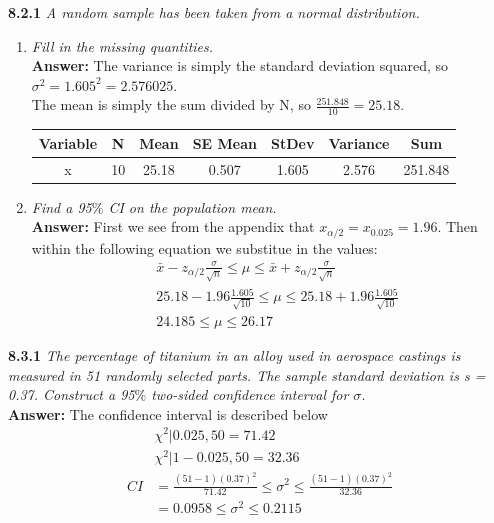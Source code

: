 \documentclass[11pt]{article}
\begin{document}
\noindent \textbf{8.2.1} \emph{ A random sample has been taken from a normal distribution.}
\begin{enumerate}
\item \emph{Fill in the missing quantities.}
\\\textbf{Answer:}
The variance is simply the standard deviation squared, so $\sigma^2 = 1.605^2 = 2.576025$.\\
The mean is simply the sum divided by N, so $\frac{251.848}{10} = 25.18$.\\
\begin{center}
\begin{tabular} {c| c| c|c|c|c|c}
Variable & N & Mean & SE Mean & StDev & Variance & Sum \\
\hline
x & 10 & 25.18 & 0.507 & 1.605 & 2.576& 251.848
\end{tabular}
\end{center}
\item \emph{Find a 95$\%$ CI on the population mean.}
\\\textbf{Answer:}
First we see from the appendix that $x_{\alpha/2} = x_{0.025} = 1.96$. Then within the following equation we substitue in the values:
\begin{equation}
\begin{split}
&\bar{x} - z_{\alpha/2}\frac{\sigma}{\sqrt{n}} \leq \mu \leq \bar{x} + z_{\alpha/2}\frac{\sigma}{\sqrt{n}} \\
&25.18 - 1.96\frac{1.605}{\sqrt{10}} \leq \mu \leq 25.18 + 1.96\frac{1.605}{\sqrt{10}} \\
&24.185 \leq \mu \leq 26.17
\end{split}
\end{equation}
\end{enumerate}





\noindent \textbf{8.3.1} \emph{ The percentage of titanium in an alloy used in aerospace castings is measured in 51 randomly selected parts. The sample standard deviation is s = 0.37. Construct a 95$\%$ two-sided confidence interval for $\sigma$.}
\\\textbf{Answer:}
The confidence interval is described below
\begin{equation}
\begin{split}
&\chi^2|{0.025,50} = 71.42 \\
&\chi^2|{1 - 0.025,50} = 32.36 \\
CI &= \frac{(51 - 1)(0.37)^2}{71.42} \leq \sigma^2 \leq  \frac{(51 - 1)(0.37)^2}{32.36} \\
&= 0.0958\leq \sigma^2 \leq 0.2115
\end{split}
\end{equation}
\end{document}
